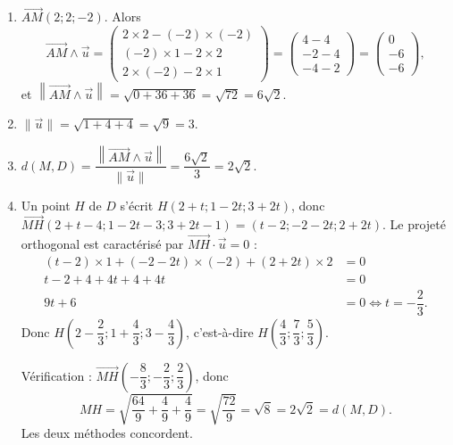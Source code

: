 \documentclass[11pt]{article}
\begin{document}
\begin{corrige}
\begin{enumerate}
\item $\overrightarrow{AM}(2 ; 2 ; -2)$. Alors
\[ \overrightarrow{AM} \wedge \vec{u} = \begin{pmatrix} 2\times 2 - (-2)\times(-2) \\ (-2)\times 1 - 2\times 2 \\ 2\times(-2) - 2\times 1 \end{pmatrix} = \begin{pmatrix} 4-4 \\ -2-4 \\ -4-2 \end{pmatrix} = \begin{pmatrix} 0 \\ -6 \\ -6 \end{pmatrix}, \]
et $\left\|\overrightarrow{AM} \wedge \vec{u}\right\| = \sqrt{0 + 36 + 36} = \sqrt{72} = 6\sqrt{2}$.
\item $\|\vec{u}\| = \sqrt{1 + 4 + 4} = \sqrt{9} = 3$.
\item $d(M, D) = \dfrac{\left\|\overrightarrow{AM} \wedge \vec{u}\right\|}{\|\vec{u}\|} = \dfrac{6\sqrt{2}}{3} = 2\sqrt{2}$.
\item Un point $H$ de $D$ s'écrit $H(2 + t ; 1 - 2t ; 3 + 2t)$, donc $\overrightarrow{MH}(2 + t - 4 ; 1 - 2t - 3 ; 3 + 2t - 1) = (t - 2 ; -2 - 2t ; 2 + 2t)$. Le projeté orthogonal est caractérisé par $\overrightarrow{MH} \cdot \vec{u} = 0$ :
\begin{align*}
(t - 2)\times 1 + (-2 - 2t)\times(-2) + (2 + 2t)\times 2 &= 0 \\
t - 2 + 4 + 4t + 4 + 4t &= 0 \\
9t + 6 &= 0 \iff t = -\dfrac{2}{3}.
\end{align*}
Donc $H\left(2 - \dfrac{2}{3} ; 1 + \dfrac{4}{3} ; 3 - \dfrac{4}{3}\right)$, c'est-à-dire $H\left(\dfrac{4}{3} ; \dfrac{7}{3} ; \dfrac{5}{3}\right)$.

Vérification : $\overrightarrow{MH}\left(-\dfrac{8}{3} ; -\dfrac{2}{3} ; \dfrac{2}{3}\right)$, donc
\[ MH = \sqrt{\dfrac{64}{9} + \dfrac{4}{9} + \dfrac{4}{9}} = \sqrt{\dfrac{72}{9}} = \sqrt{8} = 2\sqrt{2} = d(M, D). \]
Les deux méthodes concordent.
\end{enumerate}
\end{corrige}
\end{document}
